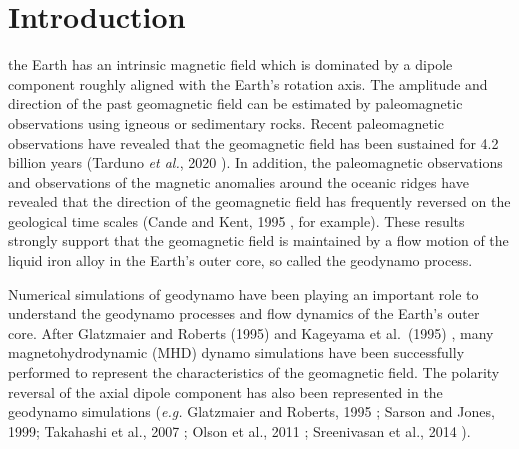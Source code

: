 \newpage
\section{Introduction}
\label{section:introduction}
the Earth has an intrinsic magnetic field which is dominated by a dipole component roughly aligned with the Earth's rotation axis. 
The amplitude and direction of the past geomagnetic field can be estimated by paleomagnetic observations using igneous or sedimentary rocks. Recent paleomagnetic observations have revealed that the geomagnetic field has been sustained for 4.2 billion years (Tarduno {\it et al.}, 2020 \cite{Tarduno:2020}).
In addition, the paleomagnetic observations and observations of the magnetic anomalies around the oceanic ridges have revealed that the direction of the geomagnetic field has frequently reversed on the geological time scales (Cande and Kent, 1995 \cite{Cande:1995}, for example). 
These results strongly support that the geomagnetic field is maintained by a flow motion of the liquid iron alloy in the Earth's outer core, so called the geodynamo process. 

Numerical simulations {\color{red} of geodynamo} have 
{\color{red} been playing an important} role to understand the geodynamo processes and flow dynamics of the Earth's outer core.
After Glatzmaier and Roberts (1995) \cite{GR:1995} and Kageyama et al.\ (1995) \cite{Kageyama:1995}, many magnetohydrodynamic (MHD) {\color{red} dynamo} simulations have been successfully performed to represent the characteristics of the geomagnetic field. 
The polarity reversal of the axial dipole component has also been represented in the geodynamo simulations ({\it e.g.} Glatzmaier and Roberts, 1995 \cite{GR:1995}; Sarson and Jones, 1999\cite{Sarson:1999}; Takahashi et al., 2007 \cite{TMH:2007}; Olson et al., 2011 \cite{Olson:2011}; Sreenivasan et al., 2014  \cite{Sreenivasan:2014}).

